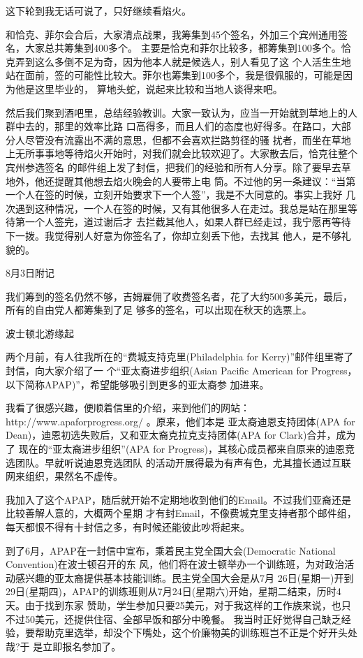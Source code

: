 ﻿\documentclass[11pt]{article}
\begin{document}
这下轮到我无话可说了，只好继续看焰火。

和恰克、菲尔会合后，大家清点战果，我筹集到45个签名，外加三个宾州通用签名，大家总共筹集到400多个。
主要是恰克和菲尔比较多，都筹集到100多个。恰克弄到这么多倒不足为奇，因为他本人就是候选人，别人看见了这
个人活生生地站在面前，签的可能性比较大。菲尔也筹集到100多个，我是很佩服的，可能是因为他是这里毕业的，
算地头蛇，说起来比较和当地人谈得来吧。

然后我们聚到酒吧里，总结经验教训。大家一致认为，应当一开始就到草地上的人群中去的，那里的效率比路
口高得多，而且人们的态度也好得多。在路口，大部分人尽管没有流露出不满的意思，但都不会喜欢拦路剪径的骚
扰者，而坐在草地上无所事事地等待焰火开始时，对我们就会比较欢迎了。大家散去后，恰克往整个宾州参选签名
的邮件组上发了封信，把我们的经验和所有人分享。除了要早去草地外，他还提醒其他想去焰火晚会的人要带上电
筒。不过他的另一条建议：``当第一个人在签的时候，立刻开始要求下一个人签''，我是不大同意的。事实上我好
几次遇到这种情况，一个人在签的时候，又有其他很多人在走过。我总是站在那里等待第一个人签完，道过谢后才
去拦截其他人，如果人群已经走过，我宁愿再等待下一拨。我觉得别人好意为你签名了，你却立刻丢下他，去找其
他人，是不够礼貌的。

8月3日附记

我们筹到的签名仍然不够，吉姆雇佣了收费签名者，花了大约500多美元，最后，所有的自由党人都筹集到了足
够多的签名，可以出现在秋天的选票上。

波士顿北游缘起

两个月前，有人往我所在的``费城支持克里(Philadelphia for Kerry)''邮件组里寄了封信，向大家介绍了一
个``亚太裔进步组织(Asian Pacific American for Progress，以下简称APAP)''，希望能够吸引到更多的亚太裔参
加进来。

我看了很感兴趣，便顺着信里的介绍，来到他们的网站：http://www.apaforprogress.org/ 。原来，他们本是
亚太裔迪恩支持团体(APA for Dean)，迪恩初选失败后，又和亚太裔克拉克支持团体(APA for Clark)合并，成为了
现在的``亚太裔进步组织''(APA for Progress)，其核心成员都来自原来的迪恩竞选团队。早就听说迪恩竞选团队
的活动开展得最为有声有色，尤其擅长通过互联网来组织，果然名不虚传。

我加入了这个APAP，随后就开始不定期地收到他们的Email。不过我们亚裔还是比较善解人意的，大概两个星期
才有封Email，不像费城克里支持者那个邮件组，每天都恨不得有十封信之多，有时候还能彼此吵将起来。

到了6月，APAP在一封信中宣布，乘着民主党全国大会(Democratic National Convention)在波士顿召开的东
风，他们将在波士顿举办一个训练班，为对政治活动感兴趣的亚太裔提供基本技能训练。民主党全国大会是从7月
26日(星期一)开到29日(星期四)，APAP的训练班则从7月24日(星期六)开始，星期二结束，历时4天。由于找到东家
赞助，学生参加只要25美元，对于我这样的工作族来说，也只不过50美元，还提供住宿、全部早饭和部分中晚餐。
我当时正好觉得自己缺乏经验，要帮助克里选举，却没个下嘴处，这个价廉物美的训练班岂不正是个好开头处哉?于
是立即报名参加了。
\end{document}
